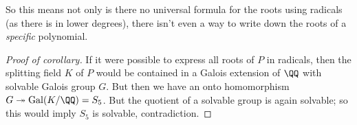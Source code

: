 So this means not only is there no universal formula for the roots using radicals (as there is in lower degrees), there isn't even a way to write down the roots of a \emph{specific} polynomial. 

\begin{proof}[Proof of corollary]
If it were possible to express all roots of $P$ in radicals, then the splitting field $K$ of $P$ would be contained in a Galois extension of $\QQ$ with solvable Galois group $G$. But then we have an onto homomorphism $G \twoheadrightarrow \operatorname{Gal}(K/\QQ) = S_5$. But the quotient of a solvable group is again solvable; so this would imply $S_5$ is solvable, contradiction. 
\end{proof}
